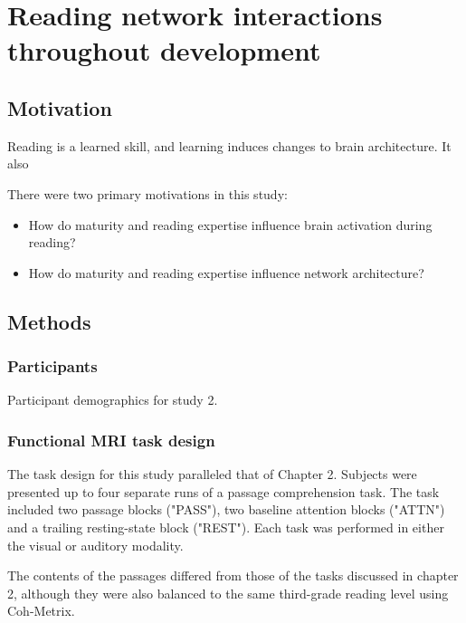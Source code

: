 \chapter{Reading network interactions throughout development}

\epigraph{}{}

\section{Motivation}

Reading is a learned skill, and learning induces changes to brain architecture. It also 

There were two primary motivations in this study:

\begin{itemize}
	\item How do maturity and reading expertise influence brain activation during reading?
	\item How do maturity and reading expertise influence network architecture?
\end{itemize} 

\section{Methods}

\subsection{Participants}

\begin{table}
	\renewcommand{\tabcolsep}{0.09cm}
	\centering
	
	\caption{Participant demographics for study 2.}
	\label{table:ch3-participants}
\end{table}

\subsection{Functional MRI task design}

The task design for this study paralleled that of Chapter 2. Subjects were presented up to four separate runs of a passage comprehension task. The task included two passage blocks ("PASS"), two baseline attention blocks ("ATTN") and a trailing resting-state block ("REST"). Each task was performed in either the visual or auditory modality.

The contents of the passages differed from those of the tasks discussed in chapter 2, although they were also balanced to the same third-grade reading level using Coh-Metrix. 

